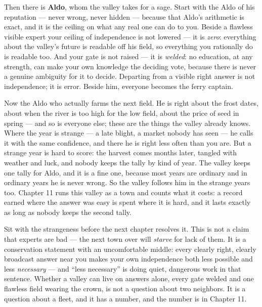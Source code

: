 Then there is \textbf{Aldo}, whom the valley takes for a sage. Start with
the Aldo of his reputation --- never wrong, never hidden --- because that
Aldo's arithmetic is exact, and it is the ceiling on what any real one
can do to you. Beside a flawless visible expert your ceiling of
independence is not lowered --- it is \emph{zero}: everything about the
valley's future is readable off his field, so everything you
rationally do is readable too. And your gate is not raised --- it is
\emph{welded}: no education, at any strength, can make your own knowledge
the deciding vote, because there is never a genuine ambiguity for it
to decide. Departing from a visible right answer is not independence;
it is error. Beside him, everyone becomes the ferry captain.

Now the Aldo who actually farms the next field. He is right about the
frost dates, about when the river is too high for the low field, about
the price of seed in spring --- and so is everyone else; these are the
things the valley already knows. Where the year is strange --- a late
blight, a market nobody has seen --- he calls it with the same
confidence, and there he is right less often than you are. But a
strange year is hard to score: the harvest comes months later, tangled
with weather and luck, and nobody keeps the tally by kind of year. The
valley keeps one tally for Aldo, and it is a fine one, because most
years are ordinary and in ordinary years he is never wrong. So the
valley follows him in the strange years too. Chapter 11 runs this
valley as a town and counts what it costs: a record earned where the
answer was easy is spent where it is hard, and it lasts exactly as
long as nobody keeps the second tally.

Sit with the strangeness before the next chapter resolves it. This is
not a claim that experts are bad --- the next town over will \emph{starve}
for lack of them. It is a conservation statement with an uncomfortable
middle: every clearly right, clearly broadcast answer near you makes
your own independence both less possible and less \emph{necessary} --- and
``less necessary'' is doing quiet, dangerous work in that sentence.
Whether a valley can live on answers alone, every gate welded and one
flawless field wearing the crown, is not a question about two
neighbors. It is a question about a fleet, and it has a number, and
the number is in Chapter 11.

